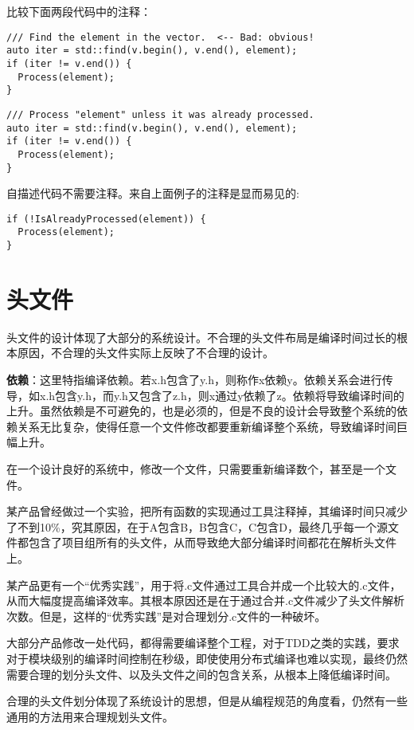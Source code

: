比较下面两段代码中的注释：
\begin{verbatim}
/// Find the element in the vector.  <-- Bad: obvious!
auto iter = std::find(v.begin(), v.end(), element);
if (iter != v.end()) {
  Process(element);
}
\end{verbatim}
\begin{verbatim}
/// Process "element" unless it was already processed.
auto iter = std::find(v.begin(), v.end(), element);
if (iter != v.end()) {
  Process(element);
}
\end{verbatim}
自描述代码不需要注释。来自上面例子的注释是显而易见的:
\begin{verbatim}
if (!IsAlreadyProcessed(element)) {
  Process(element);
}
\end{verbatim}


\chapter{头文件}
头文件的设计体现了大部分的系统设计。不合理的头文件布局是编译时间过长的根本原因，不合理的头文件实际上反映了不合理的设计。

\textbf{依赖}：这里特指编译依赖。若x.h包含了y.h，则称作x依赖y。依赖关系会进行传导，如x.h包含y.h，而y.h又包含了z.h，则x通过y依赖了z。依赖将导致编译时间的上升。虽然依赖是不可避免的，也是必须的，但是不良的设计会导致整个系统的依赖关系无比复杂，使得任意一个文件修改都要重新编译整个系统，导致编译时间巨幅上升。

在一个设计良好的系统中，修改一个文件，只需要重新编译数个，甚至是一个文件。

某产品曾经做过一个实验，把所有函数的实现通过工具注释掉，其编译时间只减少了不到10\%，究其原因，在于A包含B，B包含C，C包含D，最终几乎每一个源文件都包含了项目组所有的头文件，从而导致绝大部分编译时间都花在解析头文件上。

某产品更有一个“优秀实践”，用于将.c文件通过工具合并成一个比较大的.c文件，从而大幅度提高编译效率。其根本原因还是在于通过合并.c文件减少了头文件解析次数。但是，这样的“优秀实践”是对合理划分.c文件的一种破坏。

大部分产品修改一处代码，都得需要编译整个工程，对于TDD之类的实践，要求对于模块级别的编译时间控制在秒级，即使使用分布式编译也难以实现，最终仍然需要合理的划分头文件、以及头文件之间的包含关系，从根本上降低编译时间。

合理的头文件划分体现了系统设计的思想，但是从编程规范的角度看，仍然有一些通用的方法用来合理规划头文件。


